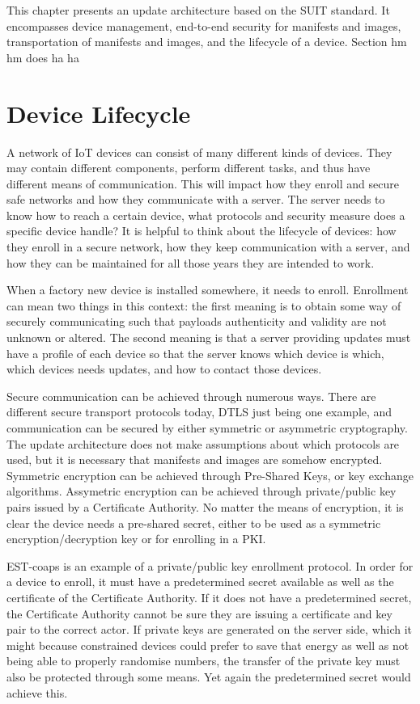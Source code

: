 \documentclass[0-thesis.tex]{subfiles}
\begin{document}
This chapter presents an update architecture based on the SUIT standard. It encompasses
device management, end-to-end security for manifests and images, transportation of
manifests and images, and the lifecycle of a device. Section hm hm does ha ha

\section{Device Lifecycle}
\label{sec:device-lifecycle}
A network of IoT devices can consist of many different kinds of devices. They may contain
different components, perform different tasks, and thus have different means of
communication. This will impact how they enroll and secure safe networks and how they
communicate with a server. The server needs to know how to reach a certain device, what
protocols and security measure does a specific device handle? It is helpful to think about
the lifecycle of devices: how they enroll in a secure network, how they keep communication
with a server, and how they can be maintained for all those years they are intended to
work.

When a factory new device is installed somewhere, it needs to enroll. Enrollment can mean
two things in this context: the first meaning is to obtain some way of securely
communicating such that payloads authenticity and validity are not unknown or altered. The
second meaning is that a server providing updates must have a profile of each device so
that the server knows which device is which, which devices needs updates, and how to
contact those devices. 

Secure communication can be achieved through numerous ways. There are different secure
transport protocols today, DTLS just being one example, and communication can be secured
by either symmetric or asymmetric cryptography. The update architecture does not make
assumptions about which protocols are used, but it is necessary that manifests and images
are somehow encrypted. Symmetric encryption can be achieved through Pre-Shared Keys, or
key exchange algorithms. Assymetric encryption can be achieved through private/public key
pairs issued by a Certificate Authority. No matter the means of encryption, it is clear
the device needs a pre-shared secret, either to be used as a symmetric
encryption/decryption key or for enrolling in a PKI.

EST-coaps is an example of a private/public key enrollment protocol. In order for a device
to enroll, it must have a predetermined secret available as well as the certificate of the
Certificate Authority. If it does not have a predetermined secret, the Certificate
Authority cannot be sure they are issuing a certificate and key pair to the correct actor.
If private keys are generated on the server side, which it might because constrained
devices could prefer to save that energy as well as not being able to properly randomise
numbers, the transfer of the private key must also be protected through some means. Yet
again the predetermined secret would achieve this.
\end{document}
